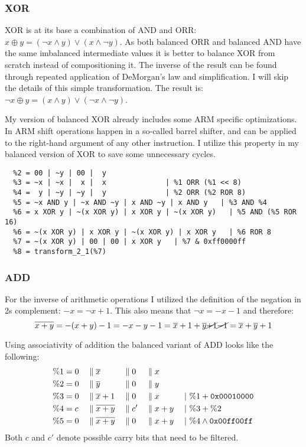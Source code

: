 \subsubsection{XOR}
XOR is at its base a combination of AND and ORR: $x \oplus y = (\neg{x} \land y) \lor (x \land \neg{y})$.
As both balanced ORR and balanced AND have the same imbalanced intermediate values it is better to balance XOR from scratch instead of compositioning it.
The inverse of the result can be found through repeated application of DeMorgan's law and simplification.
I will skip the details of this simple transformation.
The result is: $\neg{x \oplus y} = (x \land y) \lor (\neg{x} \land \neg{y})$.

My version of balanced XOR already includes some ARM specific optimizations.
In ARM shift operations happen in a so-called barrel shifter, and can be applied to the right-hand argument of any other instruction.
I utilize this property in my balanced version of XOR to save some unnecessary cycles.

\begin{lstlisting}[caption=Balanced XOR, label=lst:xor]
  %1 = 00 | ~x | 00 |  x
  %2 = 00 | ~y | 00 |  y
  %3 = ~x | ~x |  x |  x              | %1 ORR (%1 << 8)
  %4 =  y | ~y | ~y |  y              | %2 ORR (%2 ROR 8)
  %5 = ~x AND y | ~x AND ~y | x AND ~y | x AND y   | %3 AND %4
  %6 = x XOR y | ~(x XOR y) | x XOR y | ~(x XOR y)   | %5 AND (%5 ROR 16)
  %6 = ~(x XOR y) | x XOR y | ~(x XOR y) | x XOR y   | %6 ROR 8
  %7 = ~(x XOR y) | 00 | 00 | x XOR y   | %7 & 0xff0000ff
  %8 = transform_2_1(%7)
\end{lstlisting}

\subsubsection{ADD}
For the inverse of arithmetic operations I utilized the definition of the negation in 2s complement: $-x = \neg{x} + 1$.
This also means that $\neg{x} = -x - 1$ and therefore:
\begin{equation*}
  \neg{x + y} = - (x + y) - 1 = - x - y - 1 = \neg{x} + 1 + \neg{y} \cancel{+ 1} \cancel{- 1} = \neg{x} + \neg{y} + 1
\end{equation*}

Using associativity of addition the balanced variant of ADD looks like the following:
\begin{align*}
  \%1 &= 0 && \bsep \neg{x} &&\bsep 0 &&\bsep x      &&\\
  \%2 &= 0 && \bsep \neg{y} &&\bsep 0 &&\bsep y      &&\\
  \%3 &= 0 && \bsep \neg{x}+1 &&\bsep 0 &&\bsep x    &&\;|\ \%1 + \hex{00010000}\\
  \%4 &= c && \bsep \neg{x+y} &&\bsep c' &&\bsep x+y &&\;|\ \%3 + \%2\\
  \%5 &= 0 && \bsep \neg{x+y} &&\bsep 0 &&\bsep x+y  &&\;|\ \%4 \land \hex{00ff00ff}
\end{align*}
Both $c$ and $c'$ denote possible carry bits that need to be filtered.

